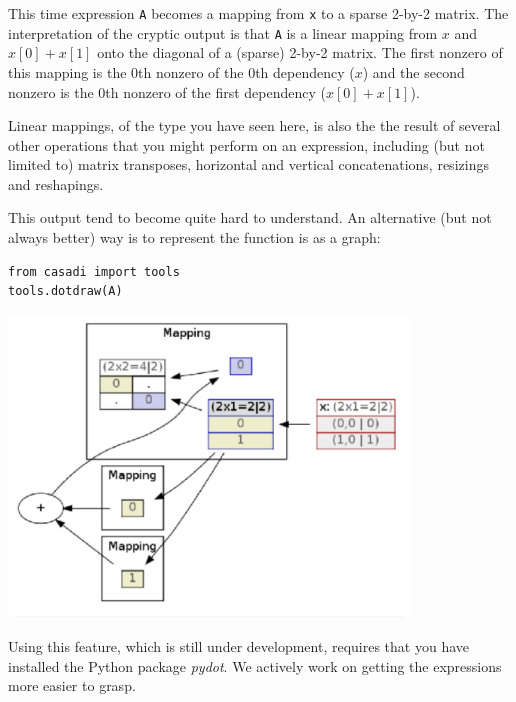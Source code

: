 \documentclass[a4paper,12pt]{book}
\newcommand{\CasADi}{\texttt{CasADi}\xspace}
\newcounter{pytexcount}
\newcounter{pytexsubcount}
\newcommand{\pytexStart}[1]{
  \addtocounter{pytexcount}{1}%
  \setcounter{pytexsubcount}{0}%
}
\begin{document}
This time expression \texttt{A} becomes a mapping from \texttt{x} to a sparse 2-by-2 matrix. The interpretation of the cryptic output is that \texttt{A} is a linear mapping from $x$ and $x[0]+x[1]$ onto the diagonal of a (sparse) 2-by-2 matrix. The first nonzero of this mapping is the 0th nonzero of the 0th dependency ($x$) and the second nonzero is the 0th nonzero of the first dependency ($x[0]+x[1]$). 

Linear mappings, of the type you have seen here, is also the the result of several other operations that you might perform on an expression, including (but not limited to) matrix transposes, horizontal and vertical concatenations, resizings and reshapings.

This output tend to become quite hard to understand. An alternative (but not always better) way is to represent the function is as a graph:

\begin{verbatim}
from casadi import tools
tools.dotdraw(A)
\end{verbatim}

\begin{center}
\includegraphics[width=0.8\textwidth]{mxdraw}
\end{center}

Using this feature, which is still under development, requires that you have installed the Python package \emph{pydot}. We actively work on getting the expressions more easier to grasp.




\end{document}
